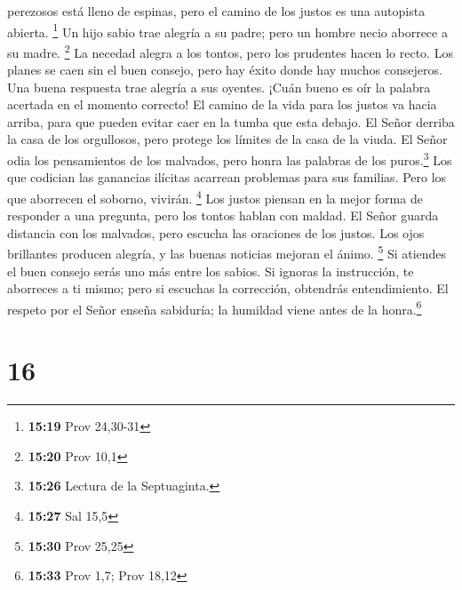 perezosos está lleno de espinas, pero el camino de los justos es una
autopista abierta. \footnote{\textbf{15:19} Prov 24,30-31}
 Un hijo sabio trae alegría a su padre; pero un hombre
necio aborrece a su madre. \footnote{\textbf{15:20} Prov 10,1}
 La necedad alegra a los tontos, pero los prudentes hacen
lo recto.  Los planes se caen sin el buen consejo, pero
hay éxito donde hay muchos consejeros.  Una buena
respuesta trae alegría a sus oyentes. ¡Cuán bueno es oír la palabra
acertada en el momento correcto!  El camino de la vida
para los justos va hacia arriba, para que pueden evitar caer en la tumba
que esta debajo.  El Señor derriba la casa de los
orgullosos, pero protege los límites de la casa de la viuda.
 El Señor odia los pensamientos de los malvados, pero
honra las palabras de los puros.\footnote{\textbf{15:26} Lectura de la
  Septuaginta.}  Los que codician las ganancias ilícitas
acarrean problemas para sus familias. Pero los que aborrecen el soborno,
vivirán. \footnote{\textbf{15:27} Sal 15,5}  Los justos
piensan en la mejor forma de responder a una pregunta, pero los tontos
hablan con maldad.  El Señor guarda distancia con los
malvados, pero escucha las oraciones de los justos.  Los
ojos brillantes producen alegría, y las buenas noticias mejoran el
ánimo. \footnote{\textbf{15:30} Prov 25,25}  Si atiendes
el buen consejo serás uno más entre los sabios.  Si
ignoras la instrucción, te aborreces a ti mismo; pero si escuchas la
corrección, obtendrás entendimiento.  El respeto por el
Señor enseña sabiduría; la humildad viene antes de la honra.\footnote{\textbf{15:33}
  Prov 1,7; Prov 18,12}

\hypertarget{section-15}{%
\section{16}\label{section-15}}

